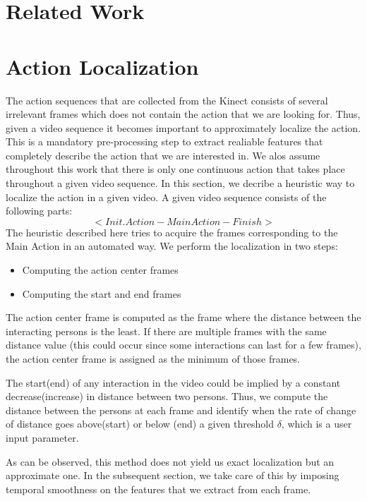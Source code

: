 \documentclass[10pt,twocolumn,letterpaper]{article}
\begin{document}
\section{Related Work}

\section{Action Localization}
The action sequences that are collected from the Kinect consists of several irrelevant frames which does not contain the action that we are looking for. Thus, given a video sequence it becomes important to approximately localize the action. This is a mandatory pre-processing step to extract realiable features that completely describe the action that  we are interested in. We alos assume throughout this work that there is only one continuous action that takes place throughout a given video sequence. In this section, we decribe a heuristic way to localize the action in a given video. A given video sequence consists of the following parts:
\begin{equation}
<Init. Action - Main Action - Finish>
\end{equation}
The heuristic described here tries to acquire the frames corresponding to the Main Action  in an automated way. We perform the localization in two steps:
\begin{itemize}
\item Computing the action center frames
\item Computing the start and end frames
\end{itemize}

The action center frame is computed as the frame where the distance between the interacting persons is the least. If there are multiple frames with the same distance value (this could occur since some interactions can last for a few frames), the action center frame is assigned as the minimum of those frames.

The start(end) of any interaction in the video could be implied by a constant decrease(increase) in distance between two persons. Thus, we compute the distance between the persons at each frame and identify when the rate of change of distance goes above(start) or below (end) a given threshold $\delta$, which is a user input parameter. 


As can be observed, this method does not yield us exact localization but an approximate one. In the subsequent section, we take care of this by imposing temporal smoothness on the features that we extract from each frame. 
\end{document}

